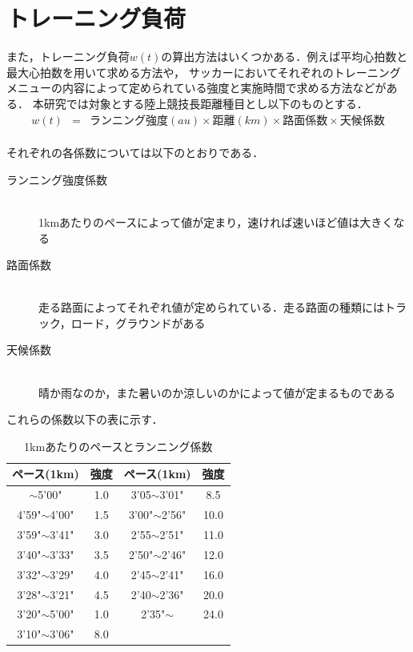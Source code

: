 \documentclass[12pt,fleqn]{jreport}
\begin{document}
\section{トレーニング負荷}
また，トレーニング負荷$w(t)$の算出方法はいくつかある．例えば平均心拍数と最大心拍数を用いて求める方法や，
サッカーにおいてそれぞれのトレーニングメニューの内容によって定められている強度と実施時間で求める方法などがある\cite{fitfig1}．
本研究では対象とする陸上競技長距離種目とし以下のものとする．\\
\vspace{1cm}
\begin{eqnarray}
  w(t)&=&ランニング強度(au)\times 距離(km)\times 路面係数\times 天候係数\label{eq:w1}%
\end{eqnarray}\\
\vspace{1cm}
それぞれの各係数については以下のとおりである．\\
\vspace{1cm}
\begin{description}
  \item[ランニング強度係数] 　\\
        1kmあたりのペースによって値が定まり，速ければ速いほど値は大きくなる
  \item[路面係数] 　\\
        走る路面によってそれぞれ値が定められている．走る路面の種類にはトラック，ロード，グラウンドがある
  \item[天候係数] 　\\
        晴か雨なのか，また暑いのか涼しいのかによって値が定まるものである
\end{description}
これらの係数以下の表に示す．
\vspace{1cm}
\begin{longtable}{|c|c|c|c|}
  \caption{1kmあたりのペースとランニング係数}       \\
  \hline
  ペース(1km)      & 強度 & ペース(1km)      & 強度 \\
  \hline
  $\sim$5'00"      & 1.0  & 3'05$\sim$3'01"  & 8.5  \\
  \hline
  4'59"$\sim$4'00" & 1.5  & 3'00"$\sim$2'56" & 10.0 \\
  \hline
  3'59"$\sim$3'41" & 3.0  & 2'55$\sim$2'51"  & 11.0 \\
  \hline
  3'40"$\sim$3'33" & 3.5  & 2'50"$\sim$2'46" & 12.0 \\
  \hline
  3'32"$\sim$3'29" & 4.0  & 2'45$\sim$2'41"  & 16.0 \\
  \hline
  3'28"$\sim$3'21" & 4.5  & 2'40$\sim$2'36"  & 20.0 \\
  \hline
  3'20"$\sim$5'00" & 1.0  & 2'35"$\sim$      & 24.0 \\
  \hline
  3'10"$\sim$3'06" & 8.0  &                  &      \\
  \hline
\end{longtable}
\end{document}
